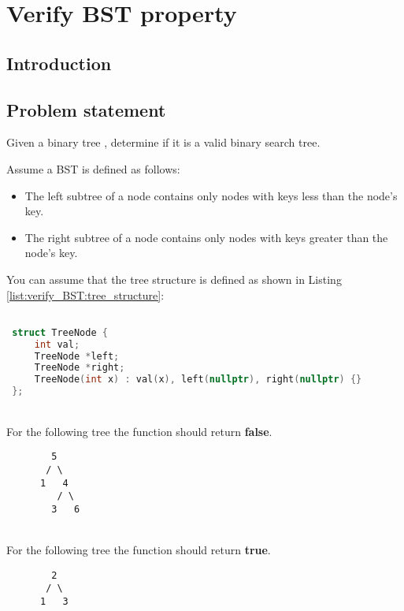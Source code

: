 %

\chapter{Verify BST property}
\label{ch:verify_BST}
\section*{Introduction}

\section{Problem statement}
\begin{exercise}
Given a binary tree \cite{cit:wiki:BST}, determine if it is a valid binary search tree.

Assume a BST is defined as follows:
\begin{itemize}
    \item The left subtree of a node contains only nodes with keys less than the node's key.
    \item The right subtree of a node contains only nodes with keys greater than the node's key.
\end{itemize}
You can assume that the tree structure is defined as shown in Listing \ref{list:verify_BST:tree_structure}: 

\end{exercise}

\begin{lstlisting}[language=c++, caption=Binary tree definition used in this exercice.,label=ist:verify_BST:tree_structure]

 struct TreeNode {
     int val;
     TreeNode *left;
     TreeNode *right;
     TreeNode(int x) : val(x), left(nullptr), right(nullptr) {}
 };
 \end{lstlisting}


\begin{example}
	\hfill \\
	For the following tree the function should return \textbf{false}.
	\begin{verbatim}
	    5
	   / \
	  1   4
	     / \
	    3   6
	\end{verbatim}
\end{example}

\begin{example}
	\hfill \\
	For the following tree the function should return \textbf{true}.
	\begin{verbatim}
	    2
	   / \
	  1   3
	\end{verbatim}
	
\end{example}

